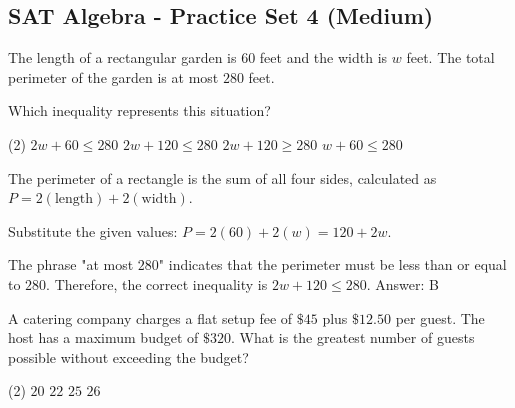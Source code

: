 \documentclass[11pt,paper=a4,answers]{exam}
\begin{document}
\begin{questions}
\pointsinrightmargin
\pointsdroppedatright
\marksnotpoints
{}
\pointformat{\boldmath\themarginpoints}
\bracketedpoints


\section*{SAT Algebra - Practice Set 4 (Medium)}

\question
The length of a rectangular garden is $60$ feet and the width is $w$ feet. The total perimeter of the garden is at most $280$ feet.
\begin{center}
\end{center}
Which inequality represents this situation?
\begin{tasks}(2)
\task $2w + 60 \leq 280$
\task $2w + 120 \leq 280$
\task $2w + 120 \geq 280$
\task $w + 60 \leq 280$
\end{tasks}

\begin{solution}
The perimeter of a rectangle is the sum of all four sides, calculated as $P = 2(\text{length}) + 2(\text{width})$.
\vspace{5pt}
\begin{center}
Substitute the given values: $P = 2(60) + 2(w) = 120 + 2w$.
\end{center}
\vspace{5pt}
The phrase "at most $280$" indicates that the perimeter must be less than or equal to $280$.
\vspace{5pt}
Therefore, the correct inequality is $2w + 120 \leq 280$.
\vspace{5pt}
Answer: \colorbox{yellow!100}{B}
\end{solution}

\vspace{1cm}

\question
A catering company charges a flat setup fee of $\$45$ plus $\$12.50$ per guest. The host has a maximum budget of $\$320$. What is the greatest number of guests possible without exceeding the budget?
\begin{tasks}(2)
\task $20$
\task $22$
\task $25$
\task $26$
\end{tasks}


\end{questions}
\end{document}
